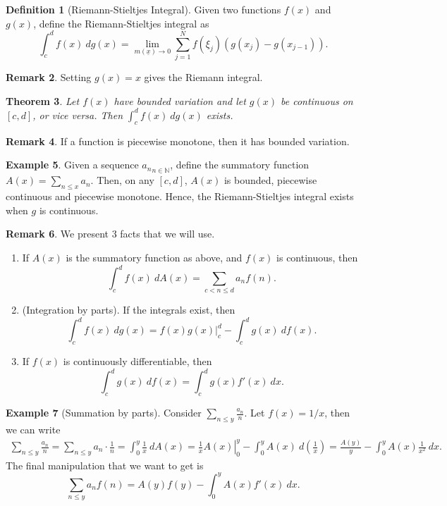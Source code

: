 \documentclass[11pt]{article}
\newtheorem{thm}{Theorem}[subsection]
\theoremstyle{definition}
\newtheorem{defn}[thm]{Definition}
\newtheorem{example}[thm]{Example}
\newtheorem{remark}[thm]{Remark}
\newcommand{\NN}{\mathbb{N}}
\begin{document}
\begin{defn}[Riemann-Stieltjes Integral]
Given two functions $f(x)$ and $g(x)$, define the Riemann-Stieltjes integral as
\[
  \int_c^df(x)~dg(x) = \lim_{m(\underline{x})\to0} \sum_{j=1}^N
  f(\xi_j)(g(x_j)-g(x_{j-1})) .
\]
\end{defn}

\begin{remark}
Setting $g(x)=x$ gives the Riemann integral.
\end{remark}

\begin{thm}
Let $f(x)$ have bounded variation and let $g(x)$ be continuous on $[c,d]$, or vice versa.
Then $\int_c^df(x)~dg(x)$ exists.
\end{thm}

\begin{remark}
If a function is piecewise monotone, then it has bounded variation.
\end{remark}

\begin{example}
Given a sequence ${a_n}_{n\in\NN}$, define the summatory function $A(x)=\sum_{n\le x}a_n$.
Then, on any $[c,d]$, $A(x)$ is bounded, piecewise continuous and piecewise monotone.
Hence, the Riemann-Stieltjes integral exists when $g$ is continuous.
\end{example}

\begin{remark}
We present 3 facts that we will use.
\begin{enumerate}
\item If $A(x)$ is the summatory function as above, and $f(x)$ is continuous, then
\[
  \int_c^d f(x) ~dA(x) = \sum_{c<n\le d} a_nf(n) .
\]
\item (Integration by parts). If the integrals exist, then
\[
  \int_c^d f(x) ~dg(x) = \left.f(x)g(x)\right|_c^d - \int_c^d g(x) ~df(x) .
\]
\item If $f(x)$ is continuously differentiable, then
\[
  \int_c^d g(x) ~df(x) = \int_c^d g(x)f'(x) ~dx .
\]
\end{enumerate}
\end{remark}

\begin{example}[Summation by parts]
Consider $\sum_{n\le y}\frac{a_n}n$. Let $f(x)=1/x$, then we can write
\begin{multline*}
\sum_{n\le y} \frac{a_n}n
= \sum_{n\le y} a_n\cdot\frac1n = \int_0^y \frac1x ~dA(x)
= \left.\frac1xA(x)\right|_0^y - \int_0^y A(x) ~d\left(\frac1x\right)
= \frac{A(y)}y - \int_0^y A(x)\frac1{x^2} ~dx .
\end{multline*}
The final manipulation that we want to get is
\begin{equation}
\sum_{n\le y} a_nf(n) = A(y)f(y) - \int_0^y A(x)f'(x) ~dx .
\label{summation by parts}
\end{equation}
\end{example}
\end{document}
